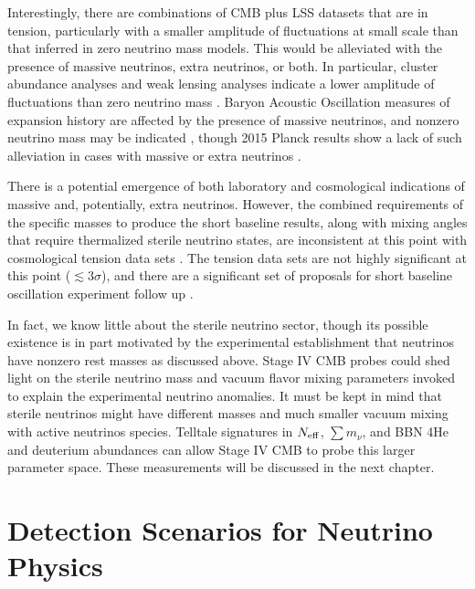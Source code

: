 Interestingly, there are combinations of CMB plus LSS
datasets that are in tension, particularly with a smaller amplitude of
fluctuations at small scale than that inferred in zero neutrino mass
models. This would be alleviated with the
presence of massive neutrinos, extra neutrinos, or both. In particular,
cluster abundance analyses \cite{Wyman:2013lza,Ade:2015fva} and weak lensing analyses
\cite{Battye:2013xqa} indicate a lower amplitude of
fluctuations than zero neutrino mass \cite{Giusarma:2014zza}. Baryon Acoustic
Oscillation measures of expansion history are affected by the presence
of massive neutrinos, and nonzero neutrino mass may be indicated 
\cite{Beutler:2014yhv}, though 2015 Planck results show a lack of such
alleviation in cases with massive or extra neutrinos
\cite{Ade:2015xua}. 

There is a potential emergence of both laboratory and cosmological
indications of massive and, potentially, extra neutrinos. However, the
combined requirements of the specific masses to produce the short
baseline results, along with mixing angles that require thermalized
sterile neutrino states, are inconsistent at this point with
cosmological tension data sets
\cite{Joudaki:2012uk,Archidiacono:2013xxa}. The tension data sets are
not highly significant at this point ($\lesssim 3\sigma$), and there
are a significant set of proposals for short baseline oscillation
experiment follow up \cite{Abazajian:2012ys}. 


In fact, we know little about the sterile neutrino sector, though its possible existence is in part motivated by the experimental establishment that neutrinos have nonzero rest masses as discussed above. Stage IV CMB probes could shed light on the sterile neutrino mass and vacuum flavor mixing parameters invoked to explain the experimental neutrino anomalies. It must be kept in mind that sterile neutrinos might have different masses and much smaller vacuum mixing with active neutrinos species. Telltale signatures in $N_{\rm eff}$, $\sum m_{\nu}$, and BBN 4He and deuterium abundances can allow Stage IV CMB to probe this larger parameter space.  These measurements will be discussed in the next chapter.



\section{Detection Scenarios for Neutrino Physics} \label{sec:neuscenarios}

